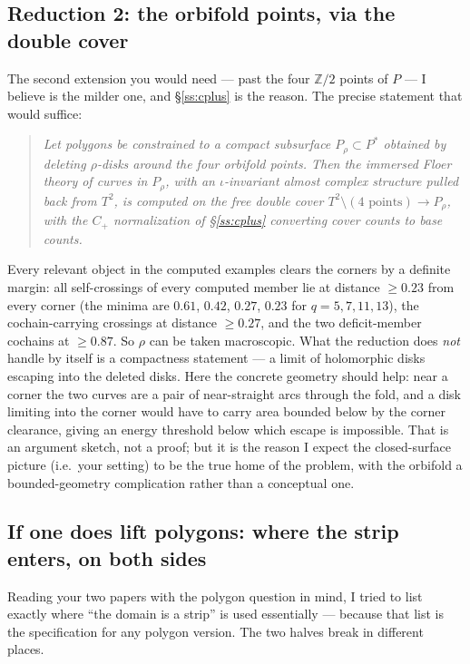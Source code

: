 \documentclass[11pt,reqno]{amsart}
\theoremstyle{plain}
\theoremstyle{definition}
\newcommand{\Z}{\mathbb{Z}}
\newcommand{\pill}{P}
\begin{document}
\subsection{Reduction 2: the orbifold points, via the double cover}\label{ss:orbifold}
The second extension you would need --- past the four $\Z/2$ points of $\pill$ --- I believe is
the milder one, and \S\ref{ss:cplus} is the reason. The precise statement that would suffice:
\begin{quote}
\emph{Let polygons be constrained to a compact subsurface
$\pill_\rho\subset\pill^*$ obtained by deleting $\rho$-disks around the four orbifold points.
Then the immersed Floer theory of curves in $\pill_\rho$, with an $\iota$-invariant almost
complex structure pulled back from $T^2$, is computed on the free double cover
$T^2\setminus(4\text{ points})\to\pill_\rho$, with the $C_+$ normalization of
\S\ref{ss:cplus} converting cover counts to base counts.}
\end{quote}
Every relevant object in the computed examples clears the corners by a definite margin: all
self-crossings of every computed member lie at distance $\ge0.23$ from every corner (the
minima are $0.61$, $0.42$, $0.27$, $0.23$ for $q=5,7,11,13$), the cochain-carrying crossings
at distance $\ge0.27$, and the two deficit-member cochains at $\ge0.87$. So $\rho$ can be
taken macroscopic. What the reduction does \emph{not} handle by itself is a compactness
statement --- a limit of holomorphic disks escaping into the deleted disks. Here the concrete
geometry should help: near a corner the two curves are a pair of near-straight arcs through
the fold, and a disk limiting into the corner would have to carry area bounded below by the
corner clearance, giving an energy threshold below which escape is impossible. That is an
argument sketch, not a proof; but it is the reason I expect the closed-surface picture (i.e.\
your setting) to be the true home of the problem, with the orbifold a bounded-geometry
complication rather than a conceptual one.

\subsection{If one does lift polygons: where the strip enters, on both sides}\label{ss:polylift}
Reading your two papers with the polygon question in mind, I tried to list exactly where
``the domain is a strip'' is used essentially --- because that list is the specification for
any polygon version. The two halves break in different places.
\end{document}
